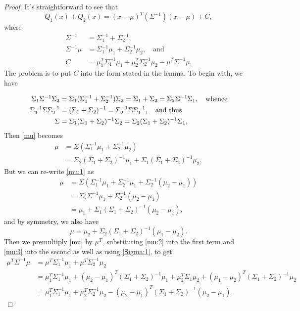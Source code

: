 \documentclass[12pt,leqno]{article}
\begin{document}
\begin{proof}

It's straightforward to see that
$$
Q_1(x) + Q_2(x) = (x-\mu)^T(\Sigma^{-1})(x-\mu) + C,
$$
where
\begin{align}
 \Sigma^{-1} &= \Sigma_1^{-1} + \Sigma_2^{-1},\label{Sigma}\\
  \Sigma^{-1}\mu &=\Sigma_1^{-1}\mu_1+\Sigma_2^{-1}\mu_2, \quad\text{and}\label{mu}\\
 C &= \mu_1^T\Sigma_1^{-1}\mu_1 +\mu_2^T\Sigma_2^{-1}\mu_2 - \mu^T\Sigma^{-1}\mu.\label{C}
\end{align}
The problem is to put $C$ into the form stated in the lemma.
 To begin with, we have

\begin{align}
  \Sigma_1\Sigma^{-1}\Sigma_2 &= \Sigma_1(\Sigma_1^{-1}+\Sigma_2^{-1})\Sigma_2 = \Sigma_1+\Sigma_2
  = \Sigma_2\Sigma^{-1}\Sigma_1,\quad\text{whence}\notag\\
  \Sigma_1^{-1}\Sigma\Sigma_2^{-1} &= (\Sigma_1+\Sigma_2)^{-1} = \Sigma_2^{-1}\Sigma\Sigma_1^{-1},\quad\text{and thus}\notag\\
  \Sigma &= \Sigma_1(\Sigma_1 + \Sigma_2)^{-1}\Sigma_2 = \Sigma_2(\Sigma_1+\Sigma_2)^{-1}\Sigma_1,\label{Sigma:1}
\end{align}
Then \eqref{mu} becomes
\begin{equation}\label{mu:1}
  \begin{split}
    \mu &=  \Sigma(\Sigma_1^{-1}\mu_1+\Sigma_2^{-1}\mu_2)\\
    &=\Sigma_2(\Sigma_1+\Sigma_2)^{-1}\mu_1+\Sigma_1(\Sigma_1+\Sigma_2)^{-1}\mu_2,
  \end{split}
\end{equation}
 But we can re-write \eqref{mu:1} as  
\begin{equation}\label{mu:2}
  \begin{split}
  \mu &= \Sigma(\Sigma_1^{-1}\mu_1 + \Sigma_2^{-1}\mu_1 +\Sigma_2^{-1}(\mu_2-\mu_1)) \\
  &= \Sigma(\Sigma^{-1}\mu_1 + \Sigma_2^{-1}(\mu_2-\mu_1) \\
  &= \mu_1 + \Sigma_1(\Sigma_1+\Sigma_2)^{-1}(\mu_2-\mu_1),
  \end{split}
  \end{equation}
and by symmetry, we also have 
\begin{equation}\label{mu:3}
  \mu = \mu_2 + \Sigma_2(\Sigma_1+\Sigma_2)^{-1}(\mu_1-\mu_2).
\end{equation}
Then we premultiply \eqref{mu} by $\mu^T$, substituting \eqref{mu:2} into the first term and
  \eqref{mu:3} into the second as well as using \eqref{Sigma:1}, to get 
\begin{align*}
    \mu^T\Sigma^{-1}\mu &= \mu^T\Sigma_1^{-1}\mu_1 + \mu^T\Sigma_2^{-1}\mu_2 \\
    &= \mu_1^T\Sigma_1^{-1}\mu_1 + (\mu_2-\mu_1)^T(\Sigma_1+\Sigma_2)^{-1}\mu_1
    +\mu_2^T\Sigma_1\mu_2 + (\mu_1-\mu_2)^T(\Sigma_1+\Sigma_2)^{-1}\mu_2\\
    &= \mu_1^T\Sigma_1^{-1}\mu_1 + \mu_2^T\Sigma_2^{-1}\mu_2 - (\mu_2-\mu_1)^T(\Sigma_1+\Sigma_2)^{-1}(\mu_2-\mu_1).
\end{align*}


\end{proof}
\end{document}
